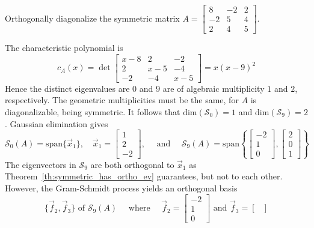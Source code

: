 \documentclass{ximera}
\begin{document}
\begin{example}\label{exa:ortho_diag_symm}
Orthogonally diagonalize the symmetric matrix $A = \begin{bmatrix}
8 & -2 & 2 \\
-2 & 5 & 4 \\
2 & 4 & 5
\end{bmatrix}$.


\begin{explanation}
  The characteristic polynomial is
\begin{equation*}
c_{A}(x) = \det  \begin{bmatrix}
x-8 & 2 & -2 \\
2 & x-5 & -4 \\
-2 & -4 & x-5
\end{bmatrix} = x(x-9)^2
\end{equation*}
Hence the distinct eigenvalues are $0$ and $9$ are of algebraic multiplicity $1$ and $2$, respectively.  The geometric multiplicities must be the same, for $A$ is diagonalizable, being symmetric. It follows that $\mbox{dim}(\mathcal{S}_0) = 1$ and $\mbox{dim}(\mathcal{S}_9) = 2$.  Gaussian elimination gives
\begin{equation*}
\mathcal{S}_{0}(A) = \mbox{span}\{\vec{x}_{1}\}, \quad \vec{x}_{1} = \begin{bmatrix}
1 \\
2 \\
-2
\end{bmatrix}, \quad \mbox{ and } \quad \mathcal{S}_{9}(A) = \mbox{span} \left\lbrace \begin{bmatrix}
	-2 \\
	1 \\
	0
	\end{bmatrix}, \begin{bmatrix}
2 \\
0 \\
1
\end{bmatrix} \right\rbrace
\end{equation*}
The eigenvectors in $\mathcal{S}_{9}$ are both orthogonal to $\vec{x}_{1}$ as Theorem~\ref{th:symmetric_has_ortho_ev} guarantees, but not to each other. However, the Gram-Schmidt process yields an orthogonal basis
\begin{equation*}
\{\vec{f}_{2}, \vec{f}_{3}\} \mbox{ of } \mathcal{S}_{9}(A) \quad \mbox{ where } \quad \vec{f}_{2} = \begin{bmatrix}
-2 \\
1 \\
0
\end{bmatrix} \mbox{ and }  \vec{f}_{3} = \begin{bmatrix}

\end{bmatrix}
\end{equation*}
\end{explanation}
\end{example}
\end{document}
